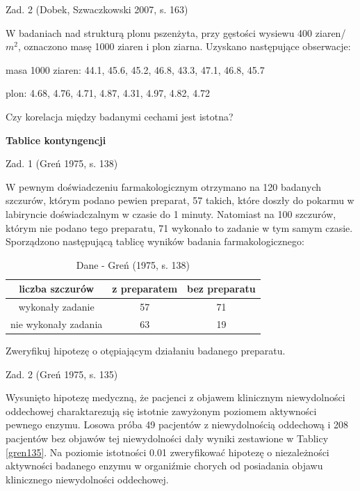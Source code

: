 \documentclass[12pt,B5paper,]{book}
\begin{document}
\vspace{0.8cm} Zad. 2 (Dobek, Szwaczkowski 2007, s. 163)

W badaniach nad strukturą plonu pszenżyta, przy gęstości wysiewu 400
ziaren/\(m^2\), oznaczono masę 1000 ziaren i plon ziarna. Uzyskano
następujące obserwacje:

masa 1000 ziaren: 44.1, 45.6, 45.2, 46.8, 43.3, 47.1, 46.8, 45.7

plon: 4.68, 4.76, 4.71, 4.87, 4.31, 4.97, 4.82, 4.72

Czy korelacja między badanymi cechami jest istotna?

\vspace{0.8cm}

\textbf{Tablice kontyngencji}

Zad. 1 (Greń 1975, s. 138)

W pewnym doświadczeniu farmakologicznym otrzymano na 120 badanych
szczurów, którym podano pewien preparat, 57 takich, które doszły do
pokarmu w labiryncie doświadczalnym w czasie do 1 minuty. Natomiast na
100 szczurów, którym nie podano tego preparatu, 71 wykonało to zadanie w
tym samym czasie. Sporządzono następującą tablicę wyników badania
farmakologicznego:

\begin{table}[H]
\centering
\caption{Dane - Greń (1975, s. 138)}
\label{gren138}
\begin{tabular}{ccc}
\hline
liczba szczurów      & z preparatem & bez preparatu \\ \hline
wykonały zadanie     & 57           & 71            \\
nie wykonały zadania & 63           & 19            \\ \hline
\end{tabular}
\end{table}

Zweryfikuj hipotezę o otępiającym działaniu badanego preparatu.

\vspace{0.8cm} Zad. 2 (Greń 1975, s. 135)

Wysunięto hipotezę medyczną, że pacjenci z objawem klinicznym
niewydolności oddechowej charaktarezują się istotnie zawyżonym poziomem
aktywności pewnego enzymu. Losowa próba 49 pacjentów z niewydolnością
oddechową i 208 pacjentów bez objawów tej niewydolności dały wyniki
zestawione w Tablicy \ref{gren135}. Na poziomie istotności 0.01
zweryfikować hipotezę o niezależności aktywności badanego enzymu w
organiźmie chorych od posiadania objawu klinicznego niewydolności
oddechowej.
\end{document}
